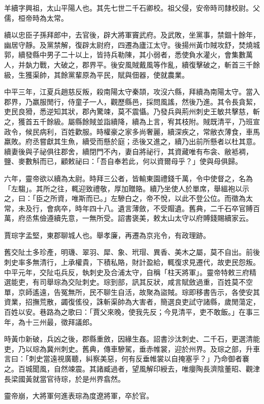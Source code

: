 \begin{pinyinscope}
羊續字興祖，太山平陽人也。其先七世二千石卿校。祖父侵，安帝時司隸校尉。父儒，桓帝時為太常。

續以忠臣子孫拜郎中，去官後，辟大將軍竇武府。及武敗，坐黨事，禁錮十餘年，幽居守靜。及黨禁解，復辟太尉府，四遷為廬江太守。後揚州黃巾賊攻舒，焚燒城郭，續發縣中男子二十以上，皆持兵勒陳，其小弱者，悉使負水灌火，會集數萬人，并埶力戰，大破之，郡界平。後安風賊戴風等作亂，續復擊破之，斬首三千餘級，生獲渠帥，其餘黨輩原為平民，賦與佃器，使就農業。

中平三年，江夏兵趙慈反叛，殺南陽太守秦頡，攻沒六縣，拜續為南陽太守。當入郡界，乃羸服閒行，侍童子一人，觀歷縣邑，採問風謠，然後乃進。其令長貪絜，吏民良猾，悉逆知其狀，郡內驚竦，莫不震懾。乃發兵與荊州刺史王敏共擊慈，斬之，獲首五千餘級。屬縣餘賊並詣續降，續為上言，宥其枝附。賊既清平，乃班宣政令，候民病利，百姓歡服。時權豪之家多尚奢麗，續深疾之，常敝衣薄食，車馬羸敗。府丞嘗獻其生魚，續受而懸於庭；丞後又進之，續乃出前所懸者以杜其意。續妻後與子祕俱往郡舍，續閉門不內，妻自將祕行，其資藏唯有布衾、敝袛裯，鹽、麥數斛而已，顧敕祕曰：「吾自奉若此，何以資爾母乎？」使與母俱歸。

六年，靈帝欲以續為太尉。時拜三公者，皆輸東園禮錢千萬，令中使督之，名為「左騶」。其所之往，輒迎致禮敬，厚加贈賂。續乃坐使人於單席，舉縕袍以示之，曰：「臣之所資，唯斯而已。」左驂白之，帝不悅，以此不登公位。而徵為太常，未及行，會病卒，時年四十八。遺言薄斂，不受賵遺。舊典，二千石卒官賻百萬，府丞焦儉遵續先意，一無所受。詔書褒美，敕太山太守以府賻錢賜續家云。

賈琮字孟堅，東郡聊城人也。舉孝廉，再遷為京兆令，有政理跡。

舊交阯土多珍產，明璣、翠羽、犀、象、玳瑁、異香、美木之屬，莫不自出。前後刺史率多無清行，上承權貴，下積私賂，財計盈給，輒復求見遷代，故吏民怨叛。中平元年，交阯屯兵反，執刺史及合浦太守，自稱「柱天將軍」。靈帝特敕三府精選能吏，有司舉琮為交阯刺史。琮到部，訊其反狀，咸言賦斂過重，百姓莫不空單，京師遙遠，告冤無所，民不聊生自活，故聚為盜賊。琮即移書告示，各使安其資業，招撫荒散，蠲復傜役，誅斬渠帥為大害者，簡選良吏試守諸縣，歲閒蕩定，百姓以安。巷路為之歌曰：「賈父來晚，使我先反；今見清平，吏不敢飯。」在事三年，為十三州最，徵拜議郎。

時黃巾新破，兵凶之後，郡縣重斂，因緣生姦。詔書沙汰刺史、二千石，更選清能吏，乃以琮為冀州刺史。舊典，傳車驂駕，垂赤帷裳，迎於州界。及琮之部，升車言曰：「刺史當遠視廣聽，糾察美惡，何有反垂帷裳以自掩塞乎？」乃命御者褰之。百城聞風，自然竦震。其諸臧過者，望風解印綬去，唯癭陶長濟陰董昭、觀津長梁國黃就當官待琮，於是州界翕然。

靈帝崩，大將軍何進表琮為度遼將軍，卒於官。


\end{pinyinscope}
